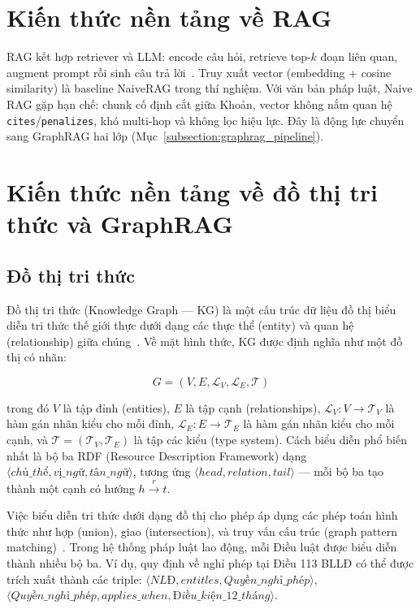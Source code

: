 \documentclass[../DoAn.tex]{subfiles}
\begin{document}
\section{Kiến thức nền tảng về RAG}
\label{section:rag_foundation}

\gls{RAG} kết hợp retriever và \gls{LLM}: encode câu hỏi, retrieve top-$k$ đoạn liên quan, augment prompt rồi sinh câu trả lời~\cite{lewis2020rag}. Truy xuất vector (embedding + cosine similarity) là baseline \gls{NaiveRAG} trong thí nghiệm. Với văn bản pháp luật, Naive RAG gặp hạn chế: chunk cố định cắt giữa Khoản, vector không nắm quan hệ \texttt{cites}/\texttt{penalizes}, khó multi-hop và không lọc hiệu lực. Đây là động lực chuyển sang GraphRAG hai lớp (Mục~\ref{subsection:graphrag_pipeline}).

\section{Kiến thức nền tảng về đồ thị tri thức và GraphRAG}
\label{section:kg_graphrag_foundation}

\subsection{Đồ thị tri thức}
\label{subsection:knowledge_graph}

Đồ thị tri thức (Knowledge Graph --- KG) là một cấu trúc dữ liệu đồ thị biểu diễn tri thức thế giới thực dưới dạng các thực thể (entity) và quan hệ (relationship) giữa chúng~\cite{ji2022kgsurvey}. Về mặt hình thức, KG được định nghĩa như một đồ thị có nhãn:

\[
G = (V, E, \mathcal{L}_V, \mathcal{L}_E, \mathcal{T})
\]

trong đó $V$ là tập đỉnh (entities), $E$ là tập cạnh (relationships), $\mathcal{L}_V : V \to \mathcal{T}_V$ là hàm gán nhãn kiểu cho mỗi đỉnh, $\mathcal{L}_E : E \to \mathcal{T}_E$ là hàm gán nhãn kiểu cho mỗi cạnh, và $\mathcal{T} = (\mathcal{T}_V, \mathcal{T}_E)$ là tập các kiểu (type system). Cách biểu diễn phổ biến nhất là bộ ba RDF (Resource Description Framework) dạng $\langle chủ\_thể, vị\_ngữ, tân\_ngữ \rangle$, tương ứng $\langle head, relation, tail \rangle$ --- mỗi bộ ba tạo thành một cạnh có hướng $h \xrightarrow{r} t$.

Việc biểu diễn tri thức dưới dạng đồ thị cho phép áp dụng các phép toán hình thức như hợp (union), giao (intersection), và truy vấn cấu trúc (graph pattern matching)~\cite{wang2017kgembedding}. Trong hệ thống pháp luật lao động, mỗi Điều luật được biểu diễn thành nhiều bộ ba. Ví dụ, quy định về nghỉ phép tại Điều 113 BLLĐ có thể được trích xuất thành các triple: $\langle NLĐ, entitles, Quyền\_nghỉ\_phép \rangle$, $\langle Quyền\_nghỉ\_phép, applies\_when, Điều\_kiện\_12\_tháng \rangle$.
\end{document}
